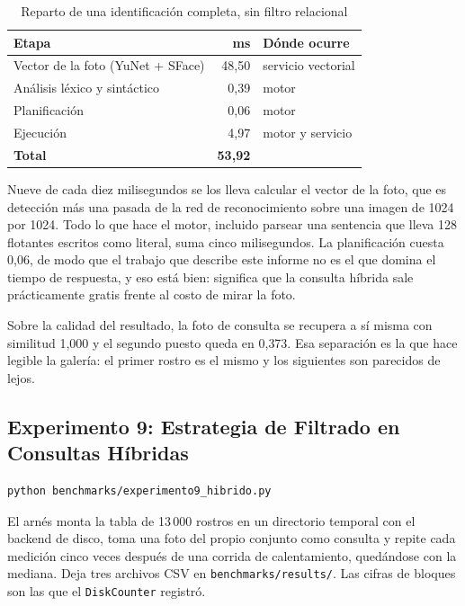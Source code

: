 \begin{table}[H]
\centering
\caption{Reparto de una identificación completa, sin filtro relacional}
\begin{tabular}{@{}lrl@{}}
\toprule
\textbf{Etapa} & \textbf{ms} & \textbf{Dónde ocurre} \\
\midrule
Vector de la foto (YuNet + SFace) & 48{,}50 & servicio vectorial \\
Análisis léxico y sintáctico & 0{,}39 & motor \\
Planificación & 0{,}06 & motor \\
Ejecución & 4{,}97 & motor y servicio \\
\midrule
\textbf{Total} & \textbf{53{,}92} & \\
\bottomrule
\end{tabular}
\end{table}

Nueve de cada diez milisegundos se los lleva calcular el vector de la foto, que
es detección más una pasada de la red de reconocimiento sobre una imagen de
1024 por 1024. Todo lo que hace el motor, incluido parsear una sentencia que
lleva 128 flotantes escritos como literal, suma cinco milisegundos. La
planificación cuesta 0{,}06, de modo que el trabajo que describe este informe no
es el que domina el tiempo de respuesta, y eso está bien: significa que la
consulta híbrida sale prácticamente gratis frente al costo de mirar la foto.

Sobre la calidad del resultado, la foto de consulta se recupera a sí misma con
similitud 1{,}000 y el segundo puesto queda en 0{,}373. Esa separación es la que
hace legible la galería: el primer rostro es el mismo y los siguientes son
parecidos de lejos.

\subsection{Experimento 9: Estrategia de Filtrado en Consultas Híbridas}

\begin{lstlisting}[language=bash, caption={Ejecución del experimento}]
python benchmarks/experimento9_hibrido.py
\end{lstlisting}

El arnés monta la tabla de 13\,000 rostros en un directorio temporal con el
backend de disco, toma una foto del propio conjunto como consulta y repite cada
medición cinco veces después de una corrida de calentamiento, quedándose con la
mediana. Deja tres archivos CSV en \texttt{benchmarks/results/}. Las cifras de
bloques son las que el \texttt{DiskCounter} registró.

